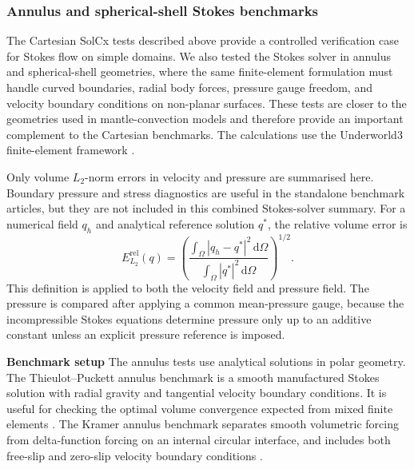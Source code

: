 
\subsubsection{Annulus and spherical-shell Stokes benchmarks}

The Cartesian SolCx tests described above provide a controlled verification
case for Stokes flow on simple domains. We also tested the Stokes solver in
annulus and spherical-shell geometries, where the same finite-element
formulation must handle curved boundaries, radial body forces, pressure gauge
freedom, and velocity boundary conditions on non-planar surfaces. These tests
are closer to the geometries used in mantle-convection models and therefore
provide an important complement to the Cartesian benchmarks. The calculations
use the Underworld3 finite-element framework \citep{moresi_underworld3_2025}.

Only volume \(L_2\)-norm errors in velocity and pressure are summarised here.
Boundary pressure and stress diagnostics are useful in the standalone benchmark
articles, but they are not included in this combined Stokes-solver summary. For
a numerical field \(q_h\) and analytical reference solution \(q^*\), the
relative volume error is
\begin{equation}
E_{L_2}^{\mathrm{rel}}(q)
=
\left(
\frac{\int_{\Omega} |q_h-q^*|^2\,\mathrm{d}\Omega}
     {\int_{\Omega} |q^*|^2\,\mathrm{d}\Omega}
\right)^{1/2}.
\end{equation}
This definition is applied to both the velocity field and pressure field.
The pressure is compared after applying a common mean-pressure gauge, because
the incompressible Stokes equations determine pressure only up to an additive
constant unless an explicit pressure reference is imposed.

\textbf{Benchmark setup}
The annulus tests use analytical solutions in polar geometry. The
Thieulot--Puckett annulus benchmark is a smooth manufactured Stokes solution
with radial gravity and tangential velocity boundary conditions. It is useful
for checking the optimal volume convergence expected from mixed finite
elements \citep{thieulot2018,girault1986femns,boffi2013}. The Kramer annulus
benchmark separates smooth volumetric forcing from delta-function forcing on an
internal circular interface, and includes both free-slip and zero-slip velocity
boundary conditions \citep{kramer2021}.


